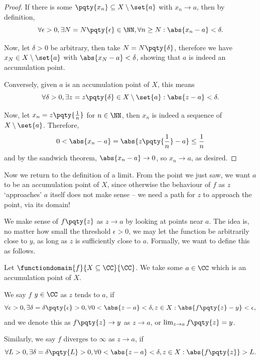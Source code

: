 \begin{proof}
    If there is some \(\pqty{x_n} \subseteq X \setminus \set{a}\) with \(x_n \to a\), then by definition,
    \[
        \forall \epsilon > 0, \exists N = N\pqty{\epsilon} \in \NN, \forall n \geq N: \abs{x_n - a} < \delta.
    \]

    Now, let \(\delta > 0\) be arbitrary, then take \(N = N\pqty{\delta}\), therefore we have \(x_N \in X \setminus \set{a}\) with \(\abs{x_N - a} < \delta\), showing that \(a\) is indeed an accumulation point.

    Conversely, given \(a\) is an accumulation point of \(X\), this means
    \[
        \forall \delta > 0, \exists z = z\pqty{\delta} \in X \setminus \set{a}: \abs{z - a} < \delta.
    \]

    Now, let \(x_n = z\pqty{\frac{1}{n}}\) for \(n \in \NN\), then \(x_n\) is indeed a sequence of \(X \setminus \set{a}\). Therefore,
    \[
        0 < \abs{x_n - a} = \abs{z\pqty{\frac{1}{n}} - a} \leq \frac{1}{n}
    \]
    and by the sandwich theorem, \(\abs{x_n - a} \to 0\), so \(x_n \to a\), as desired.
\end{proof}

Now we return to the definition of a limit. From the point we just saw, we want \(a\) to be an accumulation point of \(X\), since otherwise the behaviour of \(f\) as \(z\) `approaches' \(a\) itself does not make sense -- we need a path for \(z\) to approach the point, via its domain! 

We make sense of \(f\pqty{z}\) as \(z \to a\) by looking at points near \(a\). The idea is, no matter how small the threshold \(\epsilon > 0\), we may let the function be arbitrarily close to \(y\), as long as \(z\) is sufficiently close to \(a\). Formally, we want to define this as follows.

\begin{definition}
    \label{def:fn-limit}%
    Let \(\functiondomain{f}{X \subseteq \CC}{\CC}\). We take some \(a \in \CC\) which is an accumulation point of \(X\).


    We say \(f\)  \(y \in \CC\) as \(z\) tends to \(a\), if
    \[
        \forall \epsilon > 0, \exists \delta = \delta \pqty{\epsilon} > 0, \forall 0 < \abs{z - a} < \delta, z \in X: \abs{f\pqty{z} - y} < \epsilon,
    \]
    and we denote this as \(f\pqty{z} \to y\) as \(z \to a\), or \(\lim_{z \to a} f\pqty{z} = y\).

    Similarly, we say \(f\) diverges to \(\infty\) as \(z \to a\), if
    \[
        \forall L > 0, \exists \delta = \delta\pqty{L} > 0, \forall 0 < \abs{z - a} < \delta, z \in X: \abs{f\pqty{z}} > L.
    \]
\end{definition}

